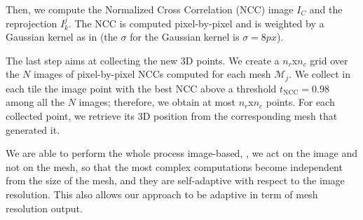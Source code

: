 
Then, we compute  the Normalized Cross Correlation (NCC) image $I_C$ and the reprojection $I_k^j$. 
The NCC is computed pixel-by-pixel and is weighted by a Gaussian kernel as in \cite{pons2007multi}  (the $\sigma$ for the Gaussian kernel is $\sigma = 8 px$).

The last step aims at collecting the new 3D points. We create a $n_r$x$n_c$ grid over the $N$ images of pixel-by-pixel NCCs computed for each mesh $\mathcal{M}_j$. We collect in each tile the image point with the best NCC above a threshold $t_{\text{NCC}} = 0.98$ among all the $N$ images; therefore, we obtain at most $n_r$x$n_c$ points.
For each collected point, we retrieve its 3D position from the corresponding mesh that generated it.

We are able to perform the whole process image-based, \ie, we act on the image and not on the mesh, so that the most complex computations become independent from the size of the mesh, and they are self-adaptive with respect to the  image resolution. This also allows our approach to be adaptive in term of mesh resolution output.

